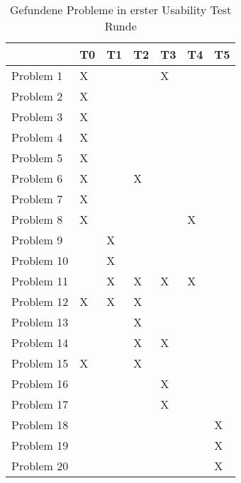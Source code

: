 \begin{table}[H]
    \caption{Gefundene Probleme in erster Usability Test Runde}\label{tbl:1stUsabilityTestsProblems}
    \begin{tabular}{l||l|l|l|l|l|l}
                & T0    & T1    & T2    & T3    & T4    & T5    \\ \hline
    Problem 1   & X     &       &       & X     &       &       \\
    Problem 2   & X     &       &       &       &       &       \\
    Problem 3   & X     &       &       &       &       &       \\
    Problem 4   & X     &       &       &       &       &       \\
    Problem 5   & X     &       &       &       &       &       \\
    Problem 6   & X     &       & X     &       &       &       \\
    Problem 7   & X     &       &       &       &       &       \\
    Problem 8   & X     &       &       &       & X     &       \\
    Problem 9   &       & X     &       &       &       &       \\
    Problem 10  &       & X     &       &       &       &       \\
    Problem 11  &       & X     & X     & X     & X     &       \\
    Problem 12  & X     & X     & X     &       &       &       \\
    Problem 13  &       &       & X     &       &       &       \\
    Problem 14  &       &       & X     & X     &       &       \\
    Problem 15  & X     &       & X     &       &       &       \\
    Problem 16  &       &       &       & X     &       &       \\
    Problem 17  &       &       &       & X     &       &       \\
    Problem 18  &       &       &       &       &       & X     \\
    Problem 19  &       &       &       &       &       & X     \\
    Problem 20  &       &       &       &       &       & X     \\
    \end{tabular}    
\end{table}

